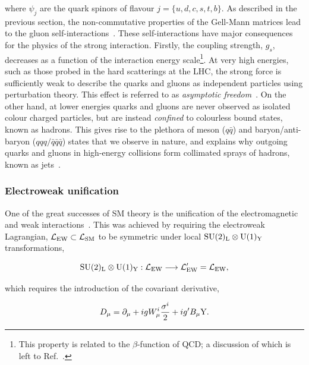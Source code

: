 \noindent
where $\psi_j$ are the quark spinors of flavour $j=\{u,d,c,s,t,b\}$. As described in the previous section, the non-commutative properties of the Gell-Mann matrices lead to the gluon self-interactions~\cite{Halzen:1984mc}. These self-interactions have major consequences for the physics of the strong interaction. Firstly, the coupling strength, $g_s$, decreases as a function of the interaction energy scale\footnote{This property is related to the $\beta$-function of QCD; a discussion of which is left to Ref.~\cite{Halzen:1984mc}.}. At very high energies, such as those probed in the hard scatterings at the LHC, the strong force is sufficiently weak to describe the quarks and gluons as independent particles using perturbation theory. This effect is referred to as \textit{asymptotic freedom}~\cite{PhysRevLett.30.1343}. On the other hand, at lower energies quarks and gluons are never observed as isolated colour charged particles, but are instead \textit{confined} to colourless bound states, known as hadrons. This gives rise to the plethora of meson ($q\bar{q}$) and baryon/anti-baryon ($qqq/\bar{q}\bar{q}\bar{q}$) states that we observe in nature, and explains why outgoing quarks and gluons in high-energy collisions form collimated sprays of hadrons, known as jets~\cite{Salam:2009jx}.

\subsubsection{Electroweak unification}
One of the great successes of SM theory is the unification of the electromagnetic and weak interactions~\cite{Glashow:1961tr,Weinberg:1967tq,Salam:1968rm}. This was achieved by requiring the electroweak Lagrangian, $\mathcal{L}_{\rm{EW}} \subset \mathcal{L}_{\rm{SM}}$ to be symmetric under local ${\rm{SU}(2)_{\rm{L}}}\otimes{\rm{U}}(1)_{\rm{Y}}$ transformations,

\begin{equation}
    {\rm{SU}}(2)_{\rm{L}}\otimes{\rm{U}}(1)_{\rm{Y}}: \mathcal{L}_{\rm{EW}} \longrightarrow \mathcal{L}'_{\rm{EW}} = \mathcal{L}_{\rm{EW}},
\end{equation}

\noindent
which requires the introduction of the covariant derivative,

\begin{equation}\label{eq:ew_covariant}
    D_\mu = \partial_\mu + i g W^i_\mu \frac{\sigma^i}{2} + i g' B_\mu {\rm{Y}}. %
\end{equation}

